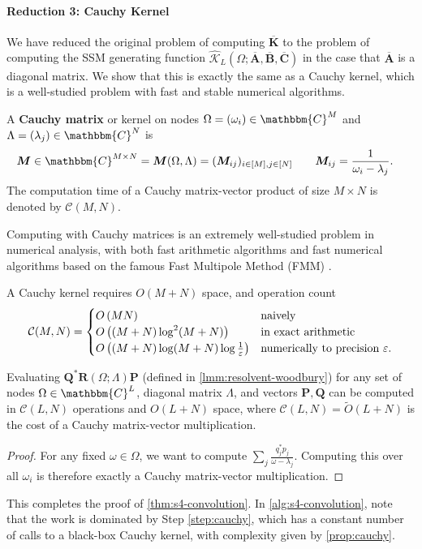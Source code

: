 \paragraph{Reduction 3: Cauchy Kernel}
We have reduced the original problem of computing \( \bm{\overline{K}} \) to the problem of computing the SSM generating function \( \hat{\mathcal{K}}_L(\Omega; \bm{\overline{A}}, \bm{\overline{B}}, \bm{\overline{C}}) \)
in the case that \( \bm{\overline{A}} \) is a diagonal matrix.
We show that this is exactly the same as a Cauchy kernel, which is a well-studied problem with fast and stable numerical algorithms.

\begin{definition}%
  \label{def:cauchy}
  A \textbf{Cauchy matrix} or kernel on nodes \( \Omega = (\omega_i) \in \mathbbm{C}^M \) and \( \Lambda = (\lambda_j) \in \mathbbm{C}^N \) is
  \begin{align*}
    \bm{M} \in \mathbbm{C}^{M \times N} &= \bm{M}(\Omega, \Lambda) = (\bm{M}_{ij})_{i \in [M], j \in [N]} \qquad
    \bm{M}_{ij} = \frac{1}{\omega_i - \lambda_j}
    .
  \end{align*}
  The computation time of a Cauchy matrix-vector product of size \( M \times N \) is denoted by \( \mathcal{C}(M, N) \).
\end{definition}

Computing with Cauchy matrices is an extremely well-studied problem in numerical analysis,
with both fast arithmetic algorithms and fast numerical algorithms based on the famous Fast Multipole Method (FMM)
\citep{pan2001structured,pan2015transformations,pan2017fast}.
\begin{proposition}[Cauchy]%
  \label{prop:cauchy}
  A Cauchy kernel requires \( O(M+N) \) space, and operation count
  \begin{align*}
    \mathcal{C}(M, N) =
    \begin{cases}%
      O\left( MN \right)  & \text{naively} \\
      O\left( (M+N) \log^2(M+N) \right) & \text{in exact arithmetic} \\
      O\left( (M+N) \log(M+N) \log \frac{1}{\varepsilon} \right) & \text{numerically to precision \( \varepsilon \)}
      .
    \end{cases}
  \end{align*}
\end{proposition}

\begin{corollary}%
  Evaluating \( \bm{Q}^* \bm{R}(\Omega; \Lambda) \bm{P} \) (defined in \cref{lmm:resolvent-woodbury}) for any set of nodes \( \Omega \in \mathbbm{C}^L \), diagonal matrix \( \Lambda \), and vectors \( \bm{P}, \bm{Q} \) can be computed in \( \mathcal{C}(L,N) \) operations and \( O(L+N) \) space, where \( \mathcal{C}(L,N) = \tilde{O}(L+N) \) is the cost of a Cauchy matrix-vector multiplication.
\end{corollary}
\begin{proof}%
  For any fixed \( \omega \in \Omega \), we want to compute \( \sum_{j} \frac{q_j^* p_j}{\omega - \lambda_j} \). Computing this over all \( \omega_i \) is therefore exactly a Cauchy matrix-vector multiplication.
\end{proof}

This completes the proof of \cref{thm:s4-convolution}.
In \cref{alg:s4-convolution},
note that the work is dominated by Step \ref{step:cauchy},
which has a constant number of calls to a black-box Cauchy kernel, with complexity given by \cref{prop:cauchy}.


